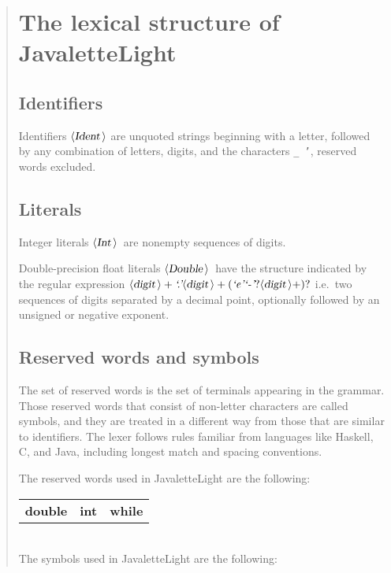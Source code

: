 \documentclass[10pt]{article}
\newcommand{\nonterminal}[1]{\mbox{$\langle \mbox{{\sl #1 }} \! \rangle$}}
\newcommand{\reserved}[1]{\mbox{{\textbf {#1}}}}
\begin{document}
\footnotesize
\begin{quote}
\section*{The lexical structure of JavaletteLight}
\subsection*{Identifiers}
Identifiers \nonterminal{Ident} are unquoted strings beginning with a letter,
followed by any combination of letters, digits, and the characters {\tt \_ '},
reserved words excluded.

\subsection*{Literals}
Integer literals \nonterminal{Int}\ are nonempty sequences of digits.

Double-precision float literals \nonterminal{Double}\ have the structure
indicated by the regular expression $\nonterminal{digit}+ \mbox{{\it `.'}} \nonterminal{digit}+ (\mbox{{\it `e'}} \mbox{{\it `-'}}? \nonterminal{digit}+)?$ i.e.\
two sequences of digits separated by a decimal point, optionally
followed by an unsigned or negative exponent.

\subsection*{Reserved words and symbols}

The set of reserved words is the set of terminals appearing in the grammar. Those reserved words that consist of non-letter characters are called symbols, and they are treated in a different way from those that are similar to identifiers. The lexer follows rules familiar from languages like Haskell, C, and Java, including longest match and spacing conventions.

The reserved words used in JavaletteLight are the following: \\

\begin{tabular}{lll}
{\reserved{double}} &{\reserved{int}} &{\reserved{while}} \\
\end{tabular}\\

The symbols used in JavaletteLight are the following: \\


\end{quote}
\end{document}
